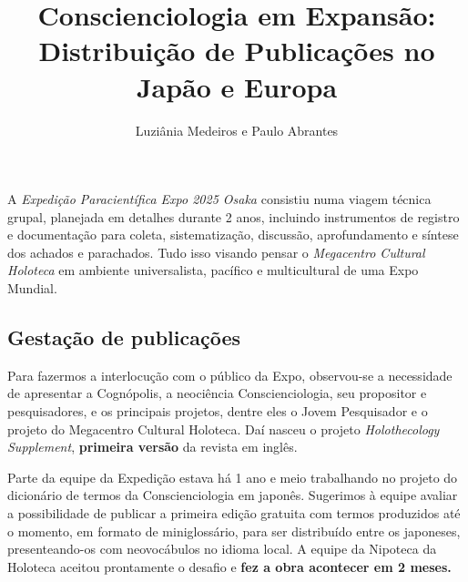 \documentclass{gescons}
\author{Luziânia Medeiros e Paulo Abrantes}
\title{Conscienciologia em Expansão: Distribuição de Publicações no Japão e Europa}
\begin{document}
    \makeentrevistatitle


    




A \emph{Expedição Paracientífica Expo 2025 Osaka} consistiu numa viagem técnica grupal, planejada em detalhes durante 2 anos, incluindo instrumentos de registro e documentação para coleta, sistematização, discussão, aprofundamento e síntese dos achados e parachados. Tudo isso visando pensar o \emph{Megacentro Cultural Holoteca} em ambiente universalista, pacífico e multicultural de uma Expo Mundial.

\subsection*{Gestação de publicações}

Para fazermos a interlocução com o público da Expo, observou-se a necessidade de apresentar a Cognópolis, a neociência Conscienciologia, seu propositor e pesquisadores, e os principais projetos, dentre eles o Jovem Pesquisador e o projeto do Megacentro Cultural Holoteca. Daí nasceu o projeto \emph{Holothecology Supplement}, \textbf{primeira versão} da revista em inglês.

Parte da equipe da Expedição estava há 1 ano e meio trabalhando no projeto do dicionário de termos da Conscienciologia em japonês. Sugerimos à equipe avaliar a possibilidade de publicar a primeira edição gratuita com termos produzidos até o momento, em formato de miniglossário, para ser distribuído entre os japoneses, presenteando-os com neovocábulos no idioma local. A equipe da Nipoteca da Holoteca aceitou prontamente o desafio e \textbf{fez a obra acontecer em 2 meses.}
\end{document}
